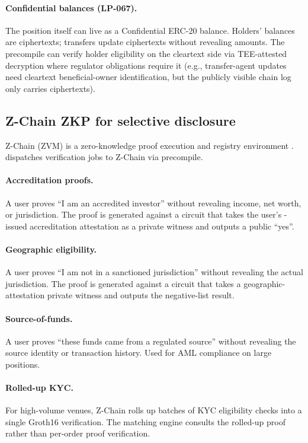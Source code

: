 \paragraph{Confidential balances (LP-067).}
The position itself can live as a Confidential ERC-20 balance.
Holders' balances are ciphertexts; transfers update ciphertexts
without revealing amounts. The \Liquidity{} precompile can verify
holder eligibility on the cleartext side via TEE-attested decryption
where regulator obligations require it (e.g., transfer-agent updates
need cleartext beneficial-owner identification, but the publicly
visible chain log only carries ciphertexts).

\subsection{Z-Chain ZKP for selective disclosure}

Z-Chain (ZVM) is a zero-knowledge proof execution and registry
environment \cite{lp-063}. \Zoo{} \DEX{} dispatches verification
jobs to Z-Chain via precompile.

\paragraph{Accreditation proofs.}
A user proves ``I am an accredited investor'' without revealing
income, net worth, or jurisdiction. The proof is generated against
a circuit that takes the user's \Liquidity{}-issued accreditation
attestation as a private witness and outputs a public ``yes''.

\paragraph{Geographic eligibility.}
A user proves ``I am not in a sanctioned jurisdiction'' without
revealing the actual jurisdiction. The proof is generated against
a circuit that takes a geographic-attestation private witness and
outputs the negative-list result.

\paragraph{Source-of-funds.}
A user proves ``these funds came from a regulated source''
without revealing the source identity or transaction history. Used
for AML compliance on large positions.

\paragraph{Rolled-up KYC.}
For high-volume venues, Z-Chain rolls up batches of KYC eligibility
checks into a single Groth16 verification. The matching engine
consults the rolled-up proof rather than per-order proof
verification.

